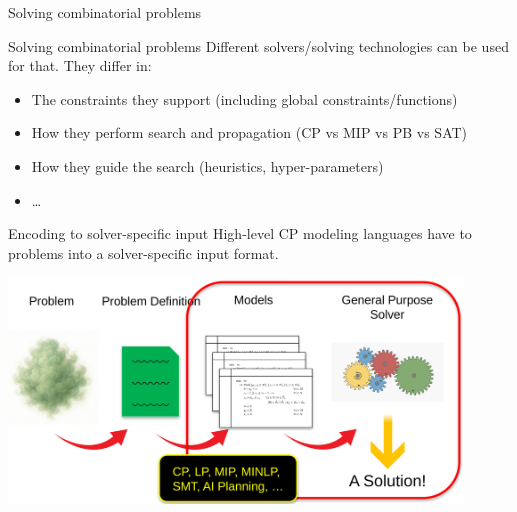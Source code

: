 \documentclass{cons-beamer}
\begin{document}
\begin{frame}{Solving combinatorial problems}

\end{frame}

\begin{frame}{Solving combinatorial problems}
  Different solvers/solving technologies can be used for that. They differ in:
  \begin{itemize}
    \item The constraints they support (including global constraints/functions)
    \item How they perform search and propagation (CP vs MIP vs PB vs SAT)
    \item How they guide the search (heuristics, hyper-parameters)
    \item \dots
  \end{itemize}
\end{frame}

\begin{frame}{Encoding to solver-specific input}
  High-level CP modeling languages have to  problems into a solver-specific input format.
  \vfill
  \begin{center}
    \includegraphics[height=60mm]{images/prob2sol.png}
  \end{center}
\end{frame}
\end{document}
